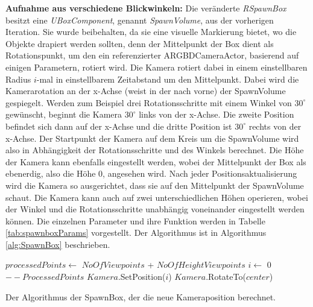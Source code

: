 \textbf{Aufnahme aus verschiedene Blickwinkeln:} Die veränderte \textit{RSpawnBox} besitzt eine \textit{UBoxComponent}, genannt \textit{SpawnVolume}, aus der vorherigen Iteration. Sie wurde beibehalten, da sie eine visuelle Markierung bietet, wo die Objekte drapiert werden sollten, denn der Mittelpunkt der Box dient als Rotationspunkt, um den ein referenzierter ARGBDCameraActor, basierend auf einigen Parametern, rotiert wird. Die Kamera rotiert dabei in einem einstellbaren Radius $i$-mal in einstellbarem Zeitabstand um den Mittelpunkt. Dabei wird die Kamerarotation an der x-Achse (weist in der \unreal nach vorne) der SpawnVolume gespiegelt. Werden zum Beispiel drei Rotationsschritte mit einem Winkel von $30^\circ$ gewünscht, beginnt die Kamera $30^\circ$ links von der x-Achse. Die zweite Position befindet sich dann auf der x-Achse und die dritte Position ist $30^\circ$ rechts von der x-Achse. Der Startpunkt der Kamera auf dem Kreis um die SpawnVolume wird also in Abhängigkeit der Rotationsschritte und des Winkels berechnet. Die Höhe der Kamera kann ebenfalls eingestellt werden, wobei der Mittelpunkt der Box als ebenerdig, also die Höhe 0, angesehen wird. Nach jeder Positionsaktualisierung wird die Kamera so ausgerichtet, dass sie auf den Mittelpunkt der SpawnVolume schaut. Die Kamera kann auch auf zwei unterschiedlichen Höhen operieren, wobei der Winkel und die Rotationsschritte unabhängig voneinander eingestellt werden können. \newline
Die einzelnen Parameter und ihre Funktion werden in Tabelle \ref{tab:spawnboxParams} vorgestellt. Der Algorithmus ist in Algorithmus \ref{alg:SpawnBox} beschrieben. \par

\begin{algorithm}[H]
\BlankLine
$processedPoints \gets$ $NoOfViewpoints$ + $NoOfHeightViewpoints$\;
$i \gets$ 0\;
$--ProcessedPoints$\;
$Kamera$.SetPosition($i$)\;
$Kamera$.RotateTo($center$)\;
\caption[SpawnBox]{Der Algorithmus der SpawnBox, der die neue Kameraposition berechnet.}
\label{alg:SpawnBox}
\end{algorithm}

